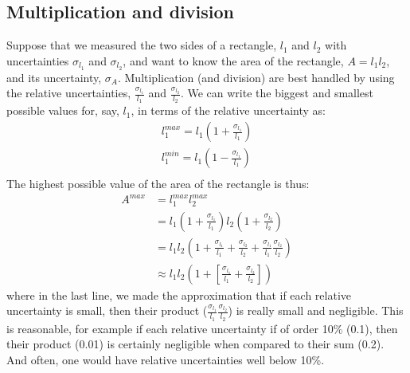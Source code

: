 \subsection{Multiplication and division}
Suppose that we measured the two sides of a rectangle, $l_1$ and $l_2$ with uncertainties $\sigma_{l_1}$ and $\sigma_{l_2}$, and want to know the area of the rectangle, $A=l_1l_2$, and its uncertainty, $\sigma_{A}$. Multiplication (and division) are best handled by using the relative uncertainties, $\frac{\sigma_{l_1}}{l_1}$ and $\frac{\sigma_{l_2}}{l_2}$. We can write the biggest and smallest possible values for, say, $l_1$, in terms of the relative uncertainty as:
\begin{align}
l_1^{max}=l_1\left(1+\frac{\sigma_{l_1}}{l_1}\right)\nonumber\\
l_1^{min}=l_1\left(1-\frac{\sigma_{l_1}}{l_1}\right)\nonumber\\
\end{align}
The highest possible value of the area of the rectangle is thus:
\begin{align}
A^{max}&=l_1^{max}l_2^{max}\nonumber\\
  &=l_1\left(1+\frac{\sigma_{l_1}}{l_1}\right)l_2\left(1+\frac{\sigma_{l_2}}{l_2}\right)\nonumber\\
  &=l_1l_2\left(1+\frac{\sigma_{l_1}}{l_1}+\frac{\sigma_{l_2}}{l_2}+\frac{\sigma_{l_1}}{l_1}\frac{\sigma_{l_2}}{l_2}\right)\nonumber\\
  &\approx l_1l_2\left(1+\left[\frac{\sigma_{l_1}}{l_1}+\frac{\sigma_{l_2}}{l_2}\right]\right)
\end{align}
where in the last line, we made the approximation that if each relative uncertainty is small, then their product ($\frac{\sigma_{l_1}}{l_1}\frac{\sigma_{l_2}}{l_2}$) is really small and negligible. This is reasonable, for example if each relative uncertainty if of order 10\% (0.1), then their product (0.01) is certainly negligible when compared to their sum (0.2). And often, one would have relative uncertainties well below 10\%.


